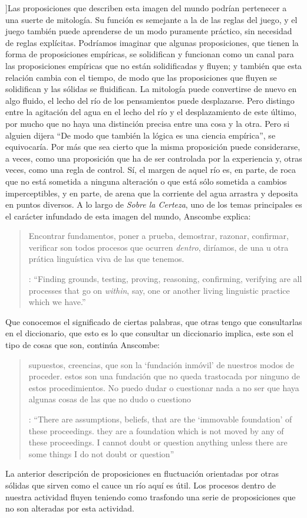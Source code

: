 ]{Las proposiciones que describen esta imagen del mundo podrían pertenecer a una suerte de mitología. Su función es semejante a la de las reglas del juego, y el juego también puede aprenderse de un modo puramente práctico, sin necesidad de reglas explícitas. Podríamos imaginar que algunas proposiciones, que tienen la forma de proposiciones empíricas, se solidifican y funcionan como un canal para las proposiciones empíricas que no están solidificadas y fluyen; y también que esta relación cambia con el tiempo, de modo que las proposiciones que fluyen se solidifican y las sólidas se fluidifican. La mitología puede convertirse de nuevo en algo fluido, el lecho del río de los pensamientos puede desplazarse. Pero distingo entre la agitación del agua en el lecho del río y el desplazamiento de este último, por mucho que no haya una distinción precisa entre una cosa y la otra. Pero si alguien dijera ``De modo que también la lógica es una ciencia empírica'', se equivocaría. Por más que sea cierto que la misma proposición puede considerarse, a veces, como una proposición que ha de ser controlada por la experiencia y, otras veces, como una regla de control. Sí, el margen de aquel río es, en parte, de roca que no está sometida a ninguna alteración o que está sólo sometida a cambios imperceptibles, y en parte, de arena que la corriente del agua arrastra y deposita en puntos diversos}.
A lo largo de \emph{Sobre la Certeza}, uno de los temas principales es el carácter infundado de esta imagen del mundo, Anscombe explica: \blockquote[{\cite[130]{anscombe1981parmenides:qli}}: \enquote{Finding grounds, testing, proving, reasoning, confirming, verifying are all processes that go on \emph{within}, say, one or another living linguistic practice which we have.}]{Encontrar fundamentos, poner a prueba, demostrar, razonar, confirmar, verificar son todos procesos que ocurren \emph{dentro}, diríamos, de una u otra prática linguística viva de las que tenemos.} Que conocemos el significado de ciertas palabras, que otras tengo que consultarlas en el diccionario, que esto es lo que consultar un diccionario implica, este son el tipo de cosas que son, continúa Anscombe: \blockquote[{\cite[130]{anscombe1981parmenides:qli}}: \enquote{There are assumptions, beliefs, that are the `immovable foundation' of these proceedings. \textelp{} they are a foundation which is not moved by any of these proceedings. I cannot doubt or question anything unless there are some things I do not doubt or question}]{supuestos, creencias, que son la `fundación inmóvil' de nuestros modos de proceder. \textelp{} estos son una fundación que no queda trastocada por ninguno de estos procedimientos. No puedo dudar o cuestionar nada a no ser que haya algunas cosas de las que no dudo o cuestiono}. La anterior descripción de proposiciones en fluctuación orientadas por otras sólidas que sirven como el cauce un río aquí es útil. Los procesos dentro de nuestra actividad fluyen teniendo como trasfondo una serie de proposiciones que no son alteradas por esta actividad.

